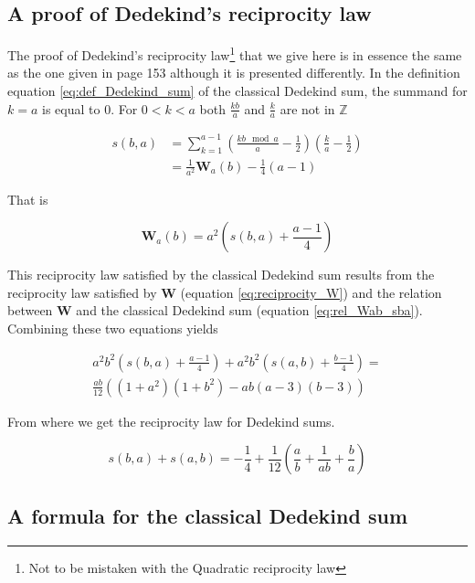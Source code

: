 \documentclass{article}%
\newcommand{\SUMW}[2]{\mathbf{W}_{#1}\left(#2\right)}
\begin{document}
\subsection{A proof of Dedekind's reciprocity law}\label{sec:proof_Dedekind_reciprocity_law}

The proof of Dedekind's reciprocity law\footnote{Not to be mistaken with the Quadratic reciprocity law} that we give here is in essence the same as the one given in \cite{zagier1973higher} page 153 although it is presented differently.
In the definition equation \ref{eq:def_Dedekind_sum} of the classical Dedekind sum, the summand for $k=a$ is equal to 0. For $0<k<a$ both $\frac{kb}{a}$ and $\frac{k}{a}$ are not in $\mathbb{Z}$

\begin{align*}
s(b,a)
&= \sum_{k=1}^{a-1} \left(\frac{kb\mod a}{a}-\frac{1}{2}\right)\left(\frac{k}{a}-\frac{1}{2}\right)\\
&= \frac{1}{a^2}\SUMW{a}{b}-\frac{1}{4}(a-1)
\end{align*}

That is

\begin{equation}
\SUMW{a}{b}=a^2 \left( s(b,a)+ \frac{a-1}{4} \right)
\label{eq:rel_Wab_sba}
\end{equation}

This reciprocity law satisfied by the classical Dedekind sum results from the reciprocity law satisfied by $\mathbf{W}$ (equation \ref{eq:reciprocity_W}) and the relation between $\mathbf{W}$ and the classical Dedekind sum (equation \ref{eq:rel_Wab_sba}).
Combining these two equations yields

\begin{multline*}
a^2b^2 \left( s(b,a)+ \frac{a-1}{4} \right) + a^2b^2 \left( s(a,b)+ \frac{b-1}{4} \right) = \\ \frac{ab}{12}\left((1+a^2)(1+b^2)-ab(a-3)(b-3)\right)
\end{multline*}

From where we get the reciprocity law for Dedekind sums.

\begin{equation*}
s(b,a)+s(a,b) = -\frac{1}{4}+\frac{1}{12}\left(\frac{a}{b}+\frac{1}{ab}+\frac{b}{a}\right)
\end{equation*}

\subsection{A formula for the classical Dedekind sum}
\end{document}

